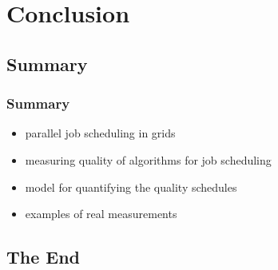 \section{Conclusion}
\subsection{Summary}

\begin{frame}
	\frametitle{Summary}
	\begin{itemize}
		\item parallel job scheduling in grids \pause
		\item measuring quality of algorithms for job scheduling \pause
		\item model for quantifying the quality schedules \pause
		\item examples of real measurements
	\end{itemize}
\end{frame}

\subsection{The End}

